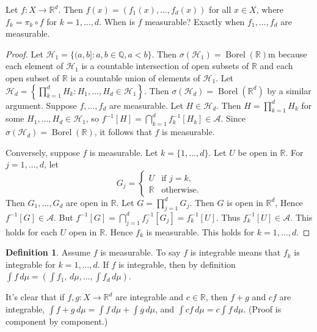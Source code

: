 \documentclass{article}
\DeclareMathOperator{\Borel}{Borel}
\newcommand{\R}{\mathbb{R}}
\newcommand{\Q}{\mathbb{Q}}
\theoremstyle{definition}
\newtheorem*{definition}{Definition}
\begin{document}
Let $f : X \longrightarrow \R^d$. Then $f(x) = (f_1(x), \ldots, f_d(x))$ for all $x \in X$, where $f_k = \pi_k \circ f$ for $k = 1, \ldots, d$. When is $f$ measurable? Exactly when $f_1, \ldots, f_d$ are measurable.
\begin{proof}
    Let $\mathscr{H}_1 = \{(a, b] : a, b \in \Q, a < b\}$. Then $\sigma(\mathscr{H}_1) = \Borel(\R)$m because each element of $\mathscr{H}_1$ is a countable intersection of open subsets of $\R$ and each open subset of $\R$ is a countable union of elements of $\mathscr{H}_1$.
    Let $\mathscr{H}_d = \left\{ \prod_{k=1}^d H_k : H_1, \ldots, H_d \in \mathscr{H}_1 \right\}$. Then $\sigma(\mathscr{H}_d) = \Borel(\R^d)$ by a similar argument. Suppose $f, \ldots, f_d$ are measurable. Let $H \in \mathscr{H}_d$. Then $H = \prod_{k=1}^d H_k$ for some $H_1, \ldots, H_d \in \mathscr{H}_1$, so $f^{-1}[H] = \bigcap_{k=1}^d f_k^{-1}[H_k] \in \mathscr{A}$. Since $\sigma(\mathscr{H}_d) = \Borel(\R)$, it follows that $f$ is measurable.
    
    Conversely, suppose $f$ is measurable. Let $k = \{1, \ldots, d\}$. Let $U$ be open in $\R$. For $j = 1, \ldots, d$, let
    \[
        G_j = \begin{cases}
            U &\text{if } j = k, \\
            \R &\text{otherwise.}
        \end{cases}
    \]
     Then $G_1, \ldots, G_d$ are open in $\R$. Let $G = \prod_{j=1}^d G_j$. Then $G$ is open in $\R^d$, Hence $f^{-1}[G] \in \mathscr{A}$. But $f^{-1}[G] = \bigcap_{j=1}^d f_j^{-1}[G_j] = f_k^{-1}[U]$. Thus $f_k^{-1}[U] \in \mathscr{A}$. This holds for each $U$ open in $\R$. Hence $f_k$ is measurable. This holds for $k = 1, \ldots, d$.
\end{proof}

\begin{definition}
Assume $f$ is measurable. To say $f$ is integrable means that $f_k$ is integrable for $k = 1, \ldots, d$. If $f$ is integrable, then by definition $\int f\,d\mu = \left( \int f_1, \,d\mu, \ldots, \int f_d\,d\mu \right)$.

It's clear that if $f, g : X \longrightarrow \R^d$ are integrable and $c \in \R$, then $f+g$ and $cf$ are integrable, $\int f + g\,d\mu = \int f\,d\mu + \int g\,d\mu$, and $\int cf\,d\mu = c\int f\,d\mu$. (Proof is component by component.)
\end{definition}
\end{document}

